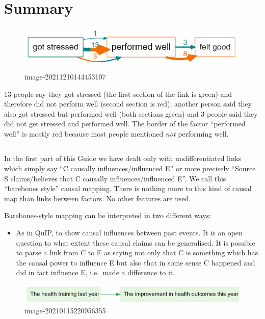 \documentclass[
]{book}
\providecommand{\tightlist}{%
  \setlength{\itemsep}{0pt}\setlength{\parskip}{0pt}}
\begin{document}
\hypertarget{summary-4}{%
\section{Summary}\label{summary-4}}

\begin{figure}
\centering
\includegraphics[width=6.77083in,height=\textheight]{_assets/image-20211210144453107.png}
\caption{image-20211210144453107}
\end{figure}

13 people say they got stressed (the first section of the link is green) and therefore did not perform well (second section is red), another person said they also got stressed but performed well (both sections green) and 3 people said they did not get stressed and performed well. The border of the factor ``performed well'' is mostly red because most people mentioned \emph{not} performing well.

\begin{center}\rule{0.5\linewidth}{0.5pt}\end{center}

In the first part of this Guide we have dealt only with undifferentiated links which simply say ``C causally influences/influenced E'' or more precisely ``Source S claims/believes that C causally influences/influenced E''. We call this ``barebones style'' causal mapping. There is nothing more to this kind of causal map than links between factors. No other features are used.

Barebones-style mapping can be interpreted in two different ways:

\begin{itemize}
\tightlist
\item
  As in QuIP, to show causal influences between past events. It is an open question to what extent these causal claims can be generalised. It is possible to parse a link from C to E as saying not only that C is something which has the causal power to influence E but also that in some sense C happened and did in fact influence E, i.e.~made a difference to it.
\end{itemize}

\begin{figure}
\centering
\includegraphics{_assets/image-20210115220956355.png}
\caption{image-20210115220956355}
\end{figure}
\end{document}

